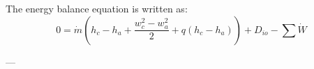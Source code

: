 The energy balance equation is written as:  
\[
0 = \dot{m} \left( h_c - h_a + \frac{w_{c}^2 - w_{a}^2}{2} + q(h_c - h_a) \right) + D_{io} - \sum \dot{W}
\]  

---